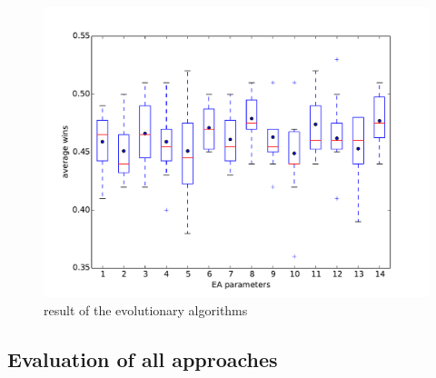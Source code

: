 \begin{figure}
\centering
\includegraphics[scale=0.7]{images/eval_evolutionary.pdf}
\caption{result of the evolutionary algorithms}
\label{fig:eval_evo}
\end{figure}








\subsection{Evaluation of all approaches} 

